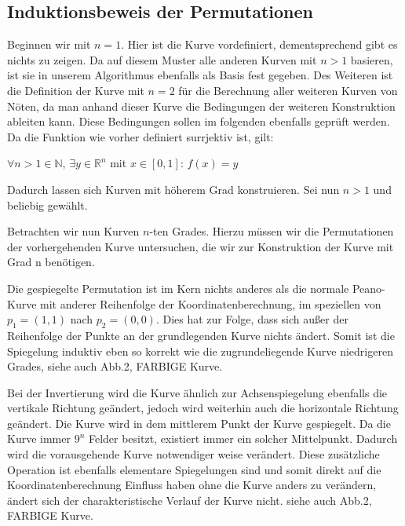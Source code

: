 \documentclass[course=asp]{aspdoc}
\begin{document}
\subsection{Induktionsbeweis der Permutationen}
Beginnen wir mit $n = 1$. Hier ist die Kurve vordefiniert, dementsprechend gibt es nichts zu zeigen. Da auf diesem Muster alle anderen Kurven mit $n>1$ basieren, ist sie in unserem Algorithmus ebenfalls als Basis fest gegeben.
Des Weiteren ist die Definition der Kurve mit $n = 2$ für die Berechnung aller weiteren Kurven von Nöten, da man anhand dieser Kurve die Bedingungen der weiteren Konstruktion ableiten kann. Diese Bedingungen sollen im folgenden ebenfalls geprüft werden.
Da die Funktion wie vorher definiert surrjektiv ist, gilt:

\begin{center}
$\forall n>1 \in \mathbb{N}$, $\exists y \in \mathbb{R}^n$ mit $x \in [0,1]$: $f(x)= y$	%
\end{center}


Dadurch lassen sich Kurven mit höherem Grad konstruieren. Sei nun $n>1$ und beliebig gewählt.

Betrachten wir nun Kurven $n$-ten Grades. Hierzu müssen wir die Permutationen der vorhergehenden Kurve untersuchen, die wir zur Konstruktion der Kurve mit Grad n benötigen.	

Die gespiegelte Permutation ist im Kern nichts anderes als die normale Peano-Kurve mit anderer Reihenfolge der Koordinatenberechnung, im speziellen von $p_1=(1,1)$ nach $p_2 = (0,0)$. Dies hat zur Folge, dass sich außer der Reihenfolge der Punkte an der grundlegenden Kurve nichts ändert. Somit ist die Spiegelung induktiv eben so korrekt wie die zugrundeliegende Kurve niedrigeren Grades, siehe auch Abb.2, FARBIGE Kurve.

Bei der Invertierung wird die Kurve ähnlich zur Achsenspiegelung ebenfalls die vertikale Richtung geändert, jedoch wird weiterhin auch die horizontale Richtung geändert. Die Kurve wird in dem mittlerem Punkt der Kurve gespiegelt. Da die Kurve immer $9^n$ Felder besitzt, existiert immer ein solcher Mittelpunkt. Dadurch wird die vorausgehende Kurve notwendiger weise verändert.  Diese zusätzliche Operation ist ebenfalls elementare Spiegelungen sind und somit direkt auf die Koordinatenberechnung Einfluss haben ohne die Kurve anders zu verändern, ändert sich der charakteristische Verlauf der Kurve nicht. siehe auch Abb.2, FARBIGE Kurve.
\end{document}
